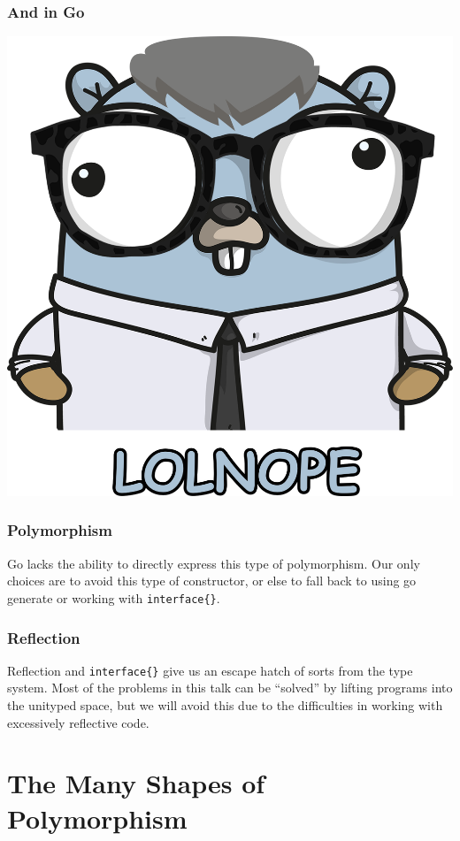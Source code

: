 \documentclass{beamer}
\begin{document}
\begin{frame}
  \frametitle{And in Go}
  \begin{center}
    \includegraphics[height=.8\paperheight]{img/nopher}
  \end{center}
\end{frame}

\begin{frame}[fragile]
  \frametitle{Polymorphism}
  Go lacks the ability to directly express this type of polymorphism.
  Our only choices are to avoid this type of constructor, or else to
  fall back to using go generate or working with \verb!interface{}!.
\end{frame}

\begin{frame}[fragile]
  \frametitle{Reflection}
  Reflection and \verb!interface{}! give us an escape hatch of sorts
  from the type system.  Most of the problems in this talk can be
  ``solved'' by lifting programs into the unityped space, but we will
  avoid this due to the difficulties in working with excessively
  reflective code.
\end{frame}


\section{The Many Shapes of Polymorphism}
\end{document}

